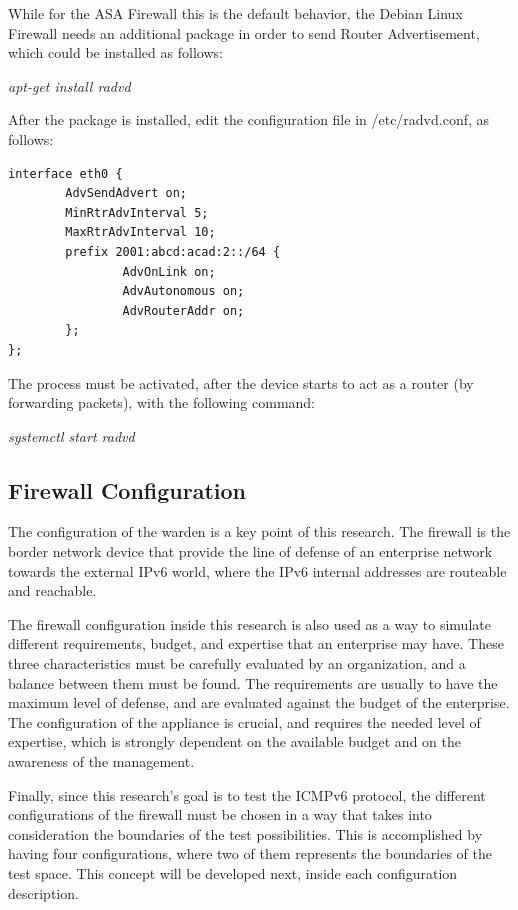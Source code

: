\documentclass[12pt]{article}
\begin{document}
While for the ASA Firewall this is the default behavior, the Debian Linux Firewall needs an additional package in order to send Router Advertisement, which could be installed as follows:

\vspace{-10pt}
\textit{apt-get install radvd}

\vspace{-10pt}
After the package is installed, edit the configuration file in /etc/radvd.conf, as follows:

\begin{lstlisting}[style=python,basicstyle=\ttfamily\scriptsize]
 interface eth0 { 
        AdvSendAdvert on;
        MinRtrAdvInterval 5; 
        MaxRtrAdvInterval 10;
        prefix 2001:abcd:acad:2::/64 { 
                AdvOnLink on; 
                AdvAutonomous on; 
                AdvRouterAddr on; 
        };
};
\end{lstlisting}
\vspace{-15pt}
The process must be activated, after the device starts to act as a router (by forwarding packets), with the following command:

\vspace{-10pt}
\textit{systemctl start radvd}


\subsection{Firewall Configuration}
\label{subsection:firewallConf}

The configuration of the warden is a key point of this research. The firewall is the border network device that provide the line of defense of an enterprise network towards the external IPv6 world, where the IPv6 internal addresses are routeable and reachable.

The firewall configuration inside this research is also used as a way to simulate different requirements, budget, and expertise that an enterprise may have. These three characteristics must be carefully evaluated by an organization, and a balance between them must be found. The requirements are usually to have the maximum level of defense, and are evaluated against the budget of the enterprise. The configuration of the appliance is crucial, and requires the needed level of expertise, which is strongly dependent on the available budget and on the awareness of the management.

Finally, since this research's goal is to test the ICMPv6 protocol, the different configurations of the firewall must be chosen in a way that takes into consideration the boundaries of the test possibilities. This is accomplished by having four configurations, where two of them represents the boundaries of the test space. This concept will be developed next, inside each configuration description.
\end{document}
